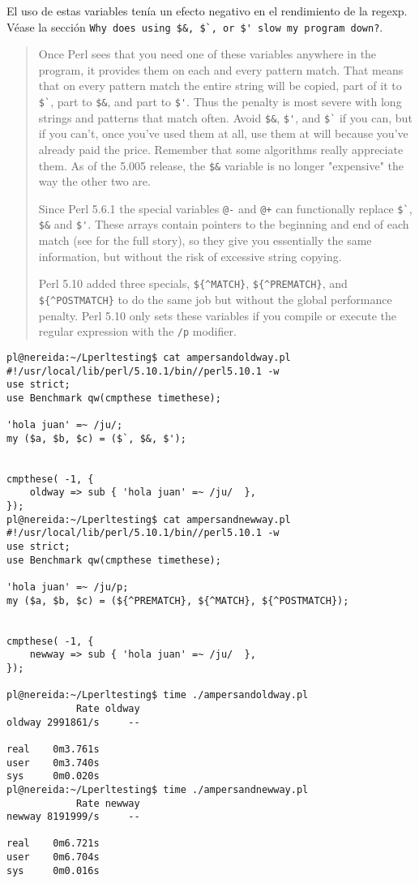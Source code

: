 El uso de estas variables tenía un efecto negativo en el rendimiento de la
regexp. Véase
 la sección 
\verb|Why does using $&, $`, or $' slow my program down?|.

\begin{it}
\begin{quotation}
Once Perl sees that you need one of these variables anywhere in the
program, it provides them on each and every pattern match. That means
that on every pattern match the entire string will be copied, part of
it to \verb|$`|, part to \verb|$&|, and part to \verb|$'|. 
Thus the penalty is most severe
with long strings and patterns that match often. Avoid \verb|$&|, \verb|$'|, and \verb|$`|
if you can, but if you can't, once you've used them at all, use them at
will because you've already paid the price. Remember that some algorithms
really appreciate them. As of the 5.005 release, the \verb|$&| variable is no
longer "expensive" the way the other two are.

Since Perl 5.6.1 the special variables \verb|@-| and \verb|@+| can functionally replace
\verb|$`|, \verb|$&| and \verb|$'|. These arrays contain pointers to the beginning and end of
each match (see  for the full story), so they give you essentially
the same information, but without the risk of excessive string copying.

Perl 5.10 added three specials, \verb|${^MATCH}|, \verb|${^PREMATCH}|, and \verb|${^POSTMATCH}|
to do the same job but without the global performance penalty. Perl
5.10 only sets these variables if you compile or execute the regular
expression with the \verb|/p| modifier.
\end{quotation}
\end{it}

\begin{verbatim}
pl@nereida:~/Lperltesting$ cat ampersandoldway.pl
#!/usr/local/lib/perl/5.10.1/bin//perl5.10.1 -w
use strict;
use Benchmark qw(cmpthese timethese);

'hola juan' =~ /ju/;
my ($a, $b, $c) = ($`, $&, $');


cmpthese( -1, {
    oldway => sub { 'hola juan' =~ /ju/  },
});
pl@nereida:~/Lperltesting$ cat ampersandnewway.pl
#!/usr/local/lib/perl/5.10.1/bin//perl5.10.1 -w
use strict;
use Benchmark qw(cmpthese timethese);

'hola juan' =~ /ju/p;
my ($a, $b, $c) = (${^PREMATCH}, ${^MATCH}, ${^POSTMATCH});


cmpthese( -1, {
    newway => sub { 'hola juan' =~ /ju/  },
});

pl@nereida:~/Lperltesting$ time ./ampersandoldway.pl
            Rate oldway
oldway 2991861/s     --

real    0m3.761s
user    0m3.740s
sys     0m0.020s
pl@nereida:~/Lperltesting$ time ./ampersandnewway.pl
            Rate newway
newway 8191999/s     --

real    0m6.721s
user    0m6.704s
sys     0m0.016s
\end{verbatim}


